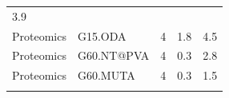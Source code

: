 \documentclass[utf8]{frontiersHLTH} %
\begin{document}
\begin{longtable}[]{@{}lllll@{}}
\begin{minipage}[t]{0.08\columnwidth}
3.9\strut
\end{minipage}\tabularnewline
\begin{minipage}[t]{0.26\columnwidth}\raggedright\strut
Proteomics\strut
\end{minipage} & \begin{minipage}[t]{0.21\columnwidth}\raggedright\strut
G15.ODA\strut
\end{minipage} & \begin{minipage}[t]{0.06\columnwidth}\raggedright\strut
4\strut
\end{minipage} & \begin{minipage}[t]{0.15\columnwidth}\raggedright\strut
1.8\strut
\end{minipage} & \begin{minipage}[t]{0.08\columnwidth}\raggedright\strut
4.5\strut
\end{minipage}\tabularnewline
\begin{minipage}[t]{0.26\columnwidth}\raggedright\strut
Proteomics\strut
\end{minipage} & \begin{minipage}[t]{0.21\columnwidth}\raggedright\strut
G60.NT@PVA\strut
\end{minipage} & \begin{minipage}[t]{0.06\columnwidth}\raggedright\strut
4\strut
\end{minipage} & \begin{minipage}[t]{0.15\columnwidth}\raggedright\strut
0.3\strut
\end{minipage} & \begin{minipage}[t]{0.08\columnwidth}\raggedright\strut
2.8\strut
\end{minipage}\tabularnewline
\begin{minipage}[t]{0.26\columnwidth}\raggedright\strut
Proteomics\strut
\end{minipage} & \begin{minipage}[t]{0.21\columnwidth}\raggedright\strut
G60.MUTA\strut
\end{minipage} & \begin{minipage}[t]{0.06\columnwidth}\raggedright\strut
4\strut
\end{minipage} & \begin{minipage}[t]{0.15\columnwidth}\raggedright\strut
0.3\strut
\end{minipage} & \begin{minipage}[t]{0.08\columnwidth}\raggedright\strut
1.5\strut
\end{minipage}\tabularnewline
\begin{minipage}[t]{0.26\columnwidth}\raggedright\strut

\end{minipage}
\end{longtable}
\end{document}
